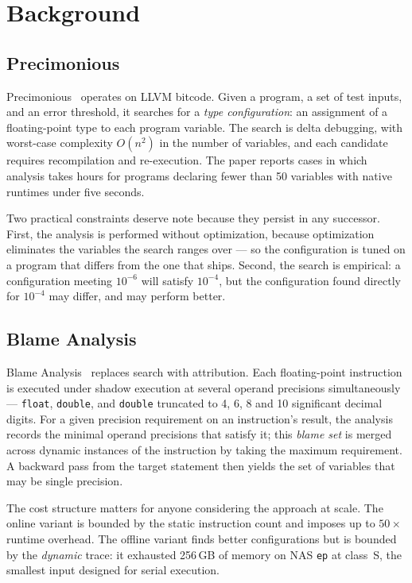 \documentclass[11pt]{article}
\begin{document}
\section{Background}
\label{sec:background}

\subsection{Precimonious}

Precimonious~\cite{precimonious} operates on LLVM bitcode. Given a program, a set
of test inputs, and an error threshold, it searches for a \emph{type
configuration}: an assignment of a floating-point type to each program variable.
The search is delta debugging, with worst-case complexity $O(n^2)$ in the number
of variables, and each candidate requires recompilation and re-execution. The
paper reports cases in which analysis takes hours for programs declaring fewer
than 50 variables with native runtimes under five seconds.

Two practical constraints deserve note because they persist in any successor.
First, the analysis is performed without optimization, because optimization
eliminates the variables the search ranges over --- so the configuration is
tuned on a program that differs from the one that ships. Second, the search is
empirical: a configuration meeting $10^{-6}$ will satisfy $10^{-4}$, but the
configuration found directly for $10^{-4}$ may differ, and may perform better.

\subsection{Blame Analysis}

Blame Analysis~\cite{blame} replaces search with attribution. Each floating-point
instruction is executed under shadow execution at several operand precisions
simultaneously --- \texttt{float}, \texttt{double}, and \texttt{double} truncated
to 4, 6, 8 and 10 significant decimal digits. For a given precision requirement
on an instruction's result, the analysis records the minimal operand precisions
that satisfy it; this \emph{blame set} is merged across dynamic instances of the
instruction by taking the maximum requirement. A backward pass from the target
statement then yields the set of variables that may be single precision.

The cost structure matters for anyone considering the approach at scale. The
online variant is bounded by the static instruction count and imposes up to
$50\times$ runtime overhead. The offline variant finds better configurations but
is bounded by the \emph{dynamic} trace: it exhausted 256\,GB of memory on NAS
\texttt{ep} at class~S, the smallest input designed for serial execution.
\end{document}
